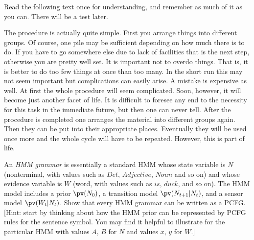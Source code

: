 \setlength{\medskipamount}{1.6\medskipamount}%

\begin{exercise}%
Read the following text once for understanding, and remember as much of
it as you can. There will be a test later.
\begin{squote}
The procedure is actually quite simple.  First you arrange things into
different groups.  Of course, one pile may be sufficient depending on how much
there is to do.  If you have to go somewhere else due to lack of facilities
that is the next step, otherwise you are pretty well set.  It is important not
to overdo things.  That is, it is better to do too few things at once than too
many.  In the short run this may not seem important but complications can
easily arise.  A mistake is expensive as well.  At first the whole procedure
will seem complicated.  Soon, however, it will become just another facet of
life.  It is difficult to foresee any end to the necessity for this task in
the immediate future, but then one can never tell.  After the procedure is
completed one arranges the material into different groups again.  Then they can
be put into their appropriate places.  Eventually they will be used once more
and the whole cycle will have to be repeated.  However, this is part of life.
\end{squote}

\end{exercise} 


\begin{exercise} %
An {\em HMM grammar} is essentially a standard HMM whose state variable
is $N$ (nonterminal, with values such as $Det$, $Adjective$, $Noun$ and so on) and whose
evidence variable is $W$ (word, with values such as $is$, $duck$, and so on). 
The HMM model includes a prior $\pv(N_0)$, a transition model $\pv(N_{t+1}|N_t)$,
and a sensor model $\pv(W_t|N_t)$.
Show that every HMM grammar can be written as a PCFG. [Hint: start by thinking about how the
HMM prior can be represented by PCFG rules for the sentence symbol. You may find it helpful
to illustrate for the particular HMM with values $A$, $B$ for $N$ and values $x$, $y$ for $W$.]
\end{exercise} 

